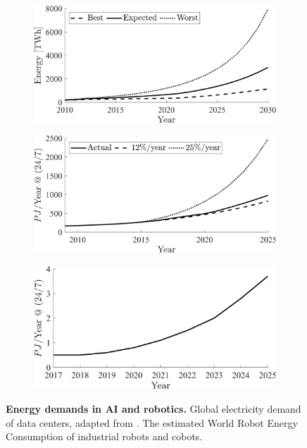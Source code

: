 \documentclass[12pt]{article}
\begin{document}
\begin{figure}[!t]
	\centering
	\hspace*{\fill}
	\begin{subfigure}[t]{0.32\textwidth}
		\subcaption{}
		\includegraphics[width= \textwidth]{data_center_energy_consumption.png} \label{fig:dataCenterEnergy}
	\end{subfigure}
	\hfill
	\begin{subfigure}[t]{0.32\textwidth}
		\subcaption{}
		\includegraphics[width=\textwidth]{ir_energy_projections.png} \label{fig:ir_energy}
	\end{subfigure}
	\hfill
	\begin{subfigure}[t]{0.32\textwidth}
		\subcaption{}
		\includegraphics[width=\textwidth]{cb_energy_projections.png} \label{fig:cobot_energy}
	\end{subfigure}	
	\hspace*{\fill}
	\caption[] {\label{fig:energy_demands_AI_robotics} \textbf{Energy demands in AI and robotics.}  Global electricity demand of data centers, adapted from \cite{andrae2015global}. The estimated World Robot Energy Consumption of  industrial robots and  cobots.}
\end{figure}
\end{document}
